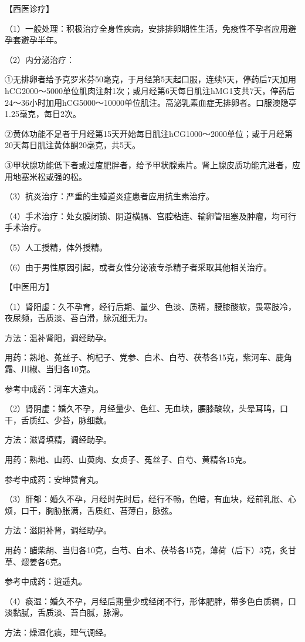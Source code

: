 \documentclass[12pt,UTF8,openany]{ctexbook}
\begin{document}
【西医诊疗】

（1）一般处理：积极治疗全身性疾病，安排排卵期性生活，免疫性不孕者应用避孕套避孕半年。

（2）内分泌治疗：

①无排卵者给予克罗米芬50毫克，于月经第5天起口服，连续5天，停药后7天加用hCG2000～5000单位肌肉注射1次；或月经第6天每日肌注hMG1支共7天，停药后24～36小时加用hCG5000～10000单位肌注。高泌乳素血症无排卵者。口服澳隐亭1.25毫克，每日2次。

②黄体功能不足者于月经第15天开始每日肌注hCG1000～2000单位；或于月经第20天每日肌注黄体酮20毫克，共5天。

③甲状腺功能低下者或过度肥胖者，给予甲状腺素片。肾上腺皮质功能亢进者，应用地塞米松或强的松。

（3）抗炎治疗：严重的生殖道炎症患者应用抗生素治疗。

（4）手术治疗：处女膜闭锁、阴道横膈、宫腔粘连、输卵管阻塞及肿瘤，均可行手术治疗。

（5）人工授精，体外授精。

（6）由于男性原因引起，或者女性分泌液专杀精子者采取其他相关治疗。

【中医用方】

（1）肾阳虚：久不孕育，经行后期、量少、色淡、质稀，腰膝酸软，畏寒肢冷，夜尿频，舌质淡、苔白滑，脉沉细无力。

方法：温补肾阳，调经助孕。

用药：熟地、菟丝子、枸杞子、党参、白术、白芍、茯苓各15克，紫河车、鹿角霜、川椒、当归各10克。

参考中成药：河车大造丸。

（2）肾阴虚：婚久不孕，月经量少、色红、无血块，腰膝酸软，头晕耳鸣，口干，舌质红、少苔，脉细数。

方法：滋肾填精，调经助孕。

用药：熟地、山药、山萸肉、女贞子、菟丝子、白芍、黄精各15克。

参考中成药：安坤赞育丸。

（3）肝郁：婚久不孕，月经时先时后，经行不畅，色暗，有血块，经前乳胀、心烦，口干，胸胁胀满，舌质红、苔薄白，脉弦。

方法：滋阴补肾，调经助孕。

用药：醋柴胡、当归各10克，白芍、白术、茯苓各15克，薄荷（后下）3克，炙甘草、煨姜各6克。

参考中成药：逍遥丸。

（4）痰湿：婚久不孕，月经后期量少或经闭不行，形体肥胖，带多色白质稠，口淡黏腻，舌质淡、苔白腻，脉滑。

方法：燥湿化痰，理气调经。
\end{document}
